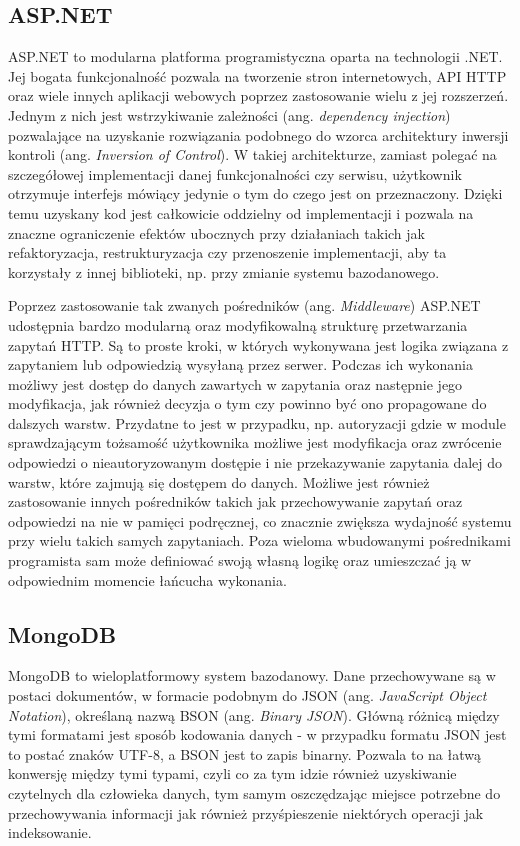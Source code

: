 \subsection*{ASP.NET}
ASP.NET to modularna platforma programistyczna oparta na technologii .NET. 
Jej bogata funkcjonalność pozwala na tworzenie stron internetowych, API HTTP oraz 
wiele innych aplikacji webowych poprzez zastosowanie wielu z jej rozszerzeń.
Jednym z nich jest wstrzykiwanie zależności (ang. \textit{dependency injection})
pozwalające na uzyskanie rozwiązania podobnego do wzorca architektury inwersji
kontroli (ang. \textit{Inversion of Control}). W takiej architekturze, zamiast
polegać na szczegółowej implementacji danej funkcjonalności czy serwisu,
użytkownik otrzymuje interfejs mówiący jedynie o tym do czego jest on przeznaczony.
Dzięki temu uzyskany kod jest całkowicie oddzielny od implementacji i pozwala
na znaczne ograniczenie efektów ubocznych przy działaniach takich jak refaktoryzacja,
restrukturyzacja czy przenoszenie implementacji, aby ta korzystały z innej biblioteki, np.
przy zmianie systemu bazodanowego.

Poprzez zastosowanie tak zwanych pośredników (ang. \textit{Middleware}) ASP.NET udostępnia
bardzo modularną oraz modyfikowalną strukturę przetwarzania zapytań HTTP.
Są to proste kroki, w których wykonywana jest logika związana z zapytaniem lub odpowiedzią
wysyłaną przez serwer. Podczas ich wykonania możliwy jest dostęp do danych zawartych
w zapytania oraz następnie jego modyfikacja, jak również decyzja o tym czy powinno
być ono propagowane do dalszych warstw. Przydatne to jest w przypadku, np. autoryzacji
gdzie w module sprawdzającym tożsamość użytkownika możliwe jest modyfikacja oraz zwrócenie
odpowiedzi o nieautoryzowanym dostępie i nie przekazywanie zapytania dalej do warstw, które zajmują
się dostępem do danych. Możliwe jest również zastosowanie innych pośredników takich
jak przechowywanie zapytań oraz odpowiedzi na nie w pamięci podręcznej, co znacznie
zwiększa wydajność systemu przy wielu takich samych zapytaniach. Poza wieloma wbudowanymi
pośrednikami programista sam może definiować swoją własną logikę oraz umieszczać
ją w odpowiednim momencie łańcucha wykonania.

\subsection*{MongoDB}
MongoDB to wieloplatformowy system bazodanowy. Dane przechowywane są w postaci dokumentów,
w formacie podobnym do JSON (ang. \textit{JavaScript Object Notation}), określaną nazwą
BSON (ang. \textit{Binary JSON}). Główną różnicą między tymi formatami jest sposób kodowania
danych - w przypadku formatu JSON jest to postać znaków UTF-8, a BSON jest to zapis binarny.
Pozwala to na łatwą konwersję między tymi typami, czyli co za tym idzie również uzyskiwanie
czytelnych dla człowieka danych, tym samym oszczędzając miejsce potrzebne do przechowywania
informacji jak również przyśpieszenie niektórych operacji jak indeksowanie.

